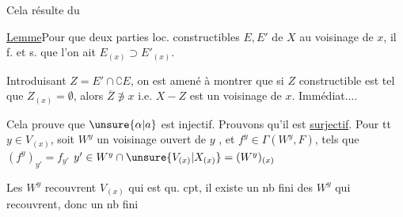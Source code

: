
 Cela résulte du

\uline{Lemme}\quad Pour que deux parties loc. constructibles $E,E'$ de $X$   au voisinage de $x$, il f. et s. que  l'on ait $E_{(x)}\supset E'_{(x)}$.

Introduisant  $Z=E'\cap\complement E$, on est amené à montrer que si $Z$ constructible est tel que $Z_{(x)}=\emptyset$, alors $\overline Z\not\ni x$ i.e. $X-Z$ est un voisinage de $x$. Immédiat....

Cela prouve que $\unsure{\alpha|a}$ est injectif. Prouvons qu'il est \uline{surjectif}.  Pour tt $y\in V_{(x)}$, soit $W^y$ un voisinage ouvert de $y$ , et $f^y\in\Gamma(W^y,F)$, tels que $(f^y)_{y'}=f_{y'}$  $y'\in W^y\cap \unsure{V_{(x)}|X_{(x)}}=(W^y)_{(x)}$





Les $W^y$ recouvrent $V_{(x)}$ qui est qu. cpt, il existe un nb fini des $W^y$ qui recouvrent, donc  un nb fini

